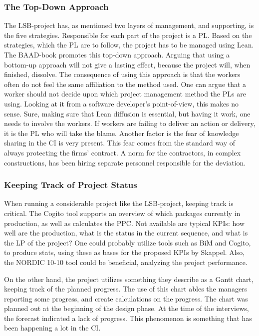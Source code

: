 \subsubsection{The Top-Down Approach}
The LSB-project has, as mentioned two layers of management, and supporting, is the five strategies. Responsible for each part of the project is a PL. Based on the strategies, which the PL are to follow, the project has to be managed using Lean. The BAAD-book promotes this top-down approach. Arguing that using a bottom-up approach will not give a lasting effect, because the project will, when finished, dissolve. The consequence of using this approach is that the workers often do not feel the same affiliation to the method used. One can argue that a worker should not decide upon which project management method the PLs are using. Looking at it from a software developer's point-of-view, this makes no sense. Sure, making sure that Lean diffusion is essential, but having it work, one needs to involve the workers. If workers are failing to deliver an action or delivery, it is the PL who will take the blame. Another factor is the fear of knowledge sharing in the CI is very present. This fear comes from the standard way of always protecting the firms' contract. A norm for the contractors, in complex constructions, has been hiring separate personnel responsible for the deviation. 

\subsubsection{Keeping Track of Project Status}
When running a considerable project like the LSB-project, keeping track is critical. The Cogito tool supports an overview of which packages currently in production, as well as calculates the PPC. Not available are typical KPIs: how well are the production, what is the status in the current sequence, and what is the LP of the project? One could probably utilize tools such as BiM and Cogito, to produce stats, using these as bases for the proposed KPIs by Skappel. Also, the NORDIC 10-10 tool could be beneficial, analyzing the project performance.

On the other hand, the project utilizes something they describe as a Gantt chart, keeping track of the planned progress. The use of this chart ables the managers reporting some progress, and create calculations on the progress. The chart was planned out at the beginning of the design phase. At the time of the interviews, the forecast indicated a lack of progress. This phenomenon is something that has been happening a lot in the CI. 

